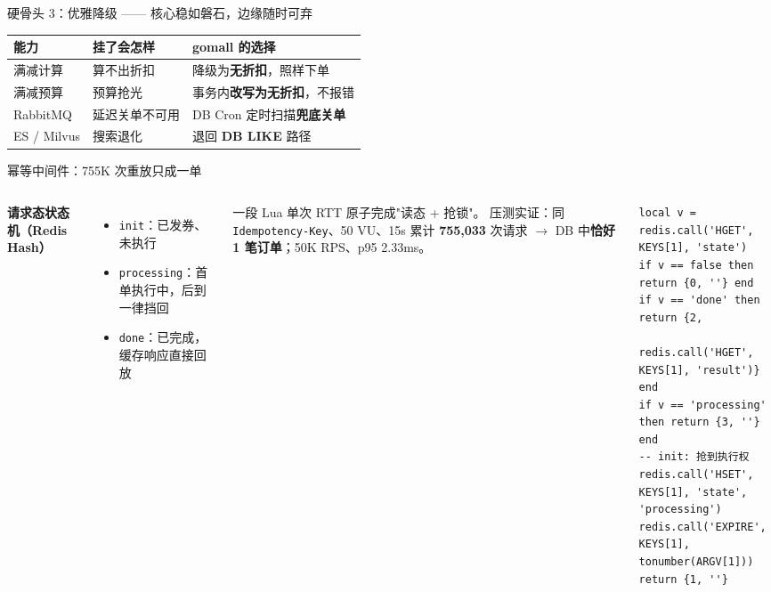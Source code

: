 \documentclass[aspectratio=169,11pt]{beamer}
\begin{document}
\begin{frame}[shrink]{硬骨头 3：优雅降级 —— 核心稳如磐石，边缘随时可弃}
\begin{tabular}{@{}lll@{}}
\toprule
能力 & 挂了会怎样 & gomall 的选择 \\
\midrule
满减计算 & 算不出折扣 & 降级为\textbf{无折扣}，照样下单 \\
满减预算 & 预算抢光 & 事务内\textbf{改写为无折扣}，不报错 \\
RabbitMQ & 延迟关单不可用 & DB Cron 定时扫描\textbf{兜底关单} \\
ES / Milvus & 搜索退化 & 退回 \textbf{DB LIKE} 路径 \\
\bottomrule
\end{tabular}
\vspace{2mm}
\end{frame}

\begin{frame}{幂等中间件：755K 次重放只成一单}
  \begin{columns}[T]
      \textbf{请求态状态机（Redis Hash）}
      \begin{itemize}\small
        \item \texttt{init}：已发券、未执行
        \item \texttt{processing}：首单执行中，后到一律挡回
        \item \texttt{done}：已完成，缓存响应直接回放
      \end{itemize}
      一段 Lua 单次 RTT 原子完成"读态 + 抢锁"。 压测实证：同 \texttt{Idempotency-Key}、50 VU、15s 累计 \textbf{755{,}033} 次请求 $\to$ DB 中\textbf{恰好 1 笔订单}；50K RPS、p95 2.33ms。
      
\begin{lstlisting}[language=LuaRedis,caption={acquire：init 到 processing 原子推进}]
local v = redis.call('HGET', KEYS[1], 'state')
if v == false then return {0, ''} end
if v == 'done' then return {2,
    redis.call('HGET', KEYS[1], 'result')} end
if v == 'processing' then return {3, ''} end
-- init: 抢到执行权
redis.call('HSET', KEYS[1], 'state', 'processing')
redis.call('EXPIRE', KEYS[1], tonumber(ARGV[1]))
return {1, ''}
\end{lstlisting}
  \end{columns}
 
\end{frame}
\end{document}

